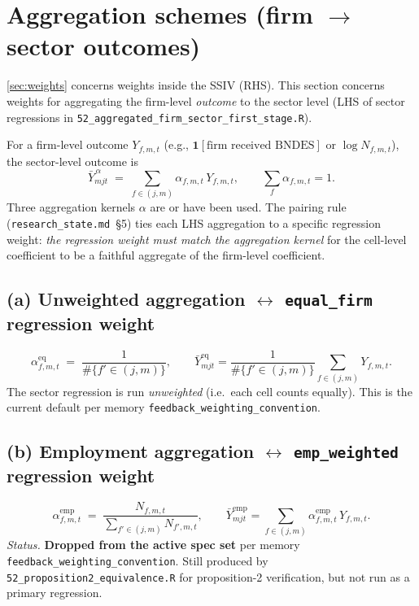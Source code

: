 \documentclass[12pt]{article}
\theoremstyle{definition}
\newcommand{\ind}{\mathbf{1}}
\begin{document}
\section{Aggregation schemes (firm $\to$ sector outcomes)}
\label{sec:aggregation}

\cref{sec:weights} concerns weights inside the SSIV (RHS). This section concerns weights for aggregating the firm-level \emph{outcome} to the sector level (LHS of sector regressions in \texttt{52\_aggregated\_firm\_sector\_first\_stage.R}).

For a firm-level outcome $Y_{f,m,t}$ (e.g., $\ind[\text{firm received BNDES}]$ or $\log N_{f,m,t}$), the sector-level outcome is
\begin{equation}
\bar Y^{\,\alpha}_{m j t} \;=\; \sum_{f \in (j,m)} \alpha_{f,m,t}\,Y_{f,m,t},\qquad \sum_f \alpha_{f,m,t} = 1.
\end{equation}
Three aggregation kernels $\alpha$ are or have been used. The pairing rule (\texttt{research\_state.md}~\S5) ties each LHS aggregation to a specific regression weight: \emph{the regression weight must match the aggregation kernel} for the cell-level coefficient to be a faithful aggregate of the firm-level coefficient.

\subsection*{(a) Unweighted aggregation $\leftrightarrow$ \texttt{equal\_firm} regression weight}
\[
  \alpha^{\text{eq}}_{f,m,t} \;=\; \frac{1}{\#\{f' \in (j,m)\}},
  \qquad
  \bar Y^{\text{eq}}_{m j t} = \frac{1}{\#\{f' \in (j,m)\}}\sum_{f \in (j,m)} Y_{f,m,t}.
\]
The sector regression is run \emph{unweighted} (i.e.\ each cell counts equally). This is the current default per memory \texttt{feedback\_weighting\_convention}.

\subsection*{(b) Employment aggregation $\leftrightarrow$ \texttt{emp\_weighted} regression weight}
\[
  \alpha^{\text{emp}}_{f,m,t} \;=\; \frac{N_{f,m,t}}{\sum_{f'\in(j,m)} N_{f',m,t}},
  \qquad
  \bar Y^{\text{emp}}_{m j t} = \sum_{f \in (j,m)} \alpha^{\text{emp}}_{f,m,t}\,Y_{f,m,t}.
\]
\textit{Status.} \textbf{Dropped from the active spec set} per memory \texttt{feedback\_weighting\_convention}. Still produced by \texttt{52\_proposition2\_equivalence.R} for proposition-2 verification, but not run as a primary regression.
\end{document}
